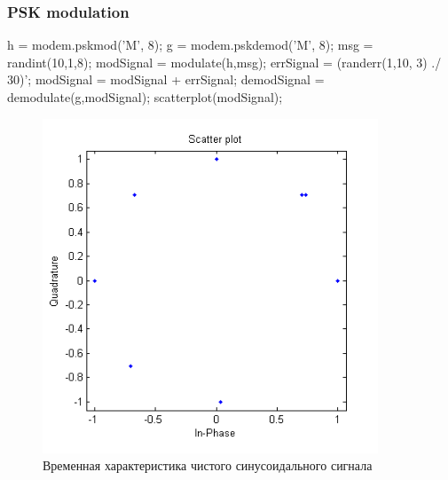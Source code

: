 \documentclass[10pt,a4paper]{article}
\begin{document}
\subsubsection{PSK modulation}
h = modem.pskmod('M', 8); \newline
g = modem.pskdemod('M', 8); \newline
msg = randint(10,1,8); \newline
modSignal = modulate(h,msg); \newline
errSignal = (randerr(1,10, 3) ./ 30)'; \newline
modSignal = modSignal + errSignal; \newline
demodSignal = demodulate(g,modSignal); \newline
scatterplot(modSignal);\newline
\begin{figure}[h]
\centering
\includegraphics[width=10cm]{1_2.png} 
\caption{Временная характеристика чистого синусоидального сигнала} 
\end{figure}
\newpage
\FloatBarrier
\end{document}
